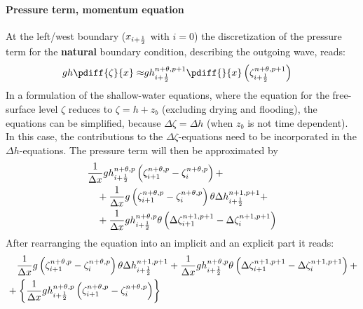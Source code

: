 \paragraph*{Pressure term, momentum equation}
At the left/west boundary ($x_{i+\frac{1}{2}}$ with $i=0$) the discretization of the pressure term for the \textbf{natural} boundary condition, describing the outgoing wave, reads:
\begin{align}
    gh \pdiff{\zeta}{x} \approx
& g h^{n+\theta,p+1}_{i+\half} \pdiff{}{x} \left( \zeta^{n+\theta,p+1}_{i+\half}\right)
\end{align}
In a formulation of the shallow-water equations, where the equation for the free-surface level $\zeta$ reduces to $\zeta = h + z_b$ (excluding drying and flooding), the equations can be simplified, because $\Delta \zeta = \Delta h$ (when $z_b$ is not time dependent).
In this case, the contributions to the $\Delta \zeta$-equations need to be incorporated in the $\Delta h$-equations.
The pressure term will then be approximated by
\begin{align}
& \frac{1}{\Delta x} g h^{n+\theta,p}_{i+\frac{1}{2}} \left( \zeta^{n+\theta,p}_{i+1} - \zeta^{n+\theta,p}_{i}  \right) +
\nonumber \\*
& \quad + \frac{1}{\Delta x}  g \left(  \zeta^{n+\theta,p}_{i+1} - \zeta^{n+\theta,p}_{i} \right) \theta \Delta h^{n+1, p+1}_{i+\frac{1}{2}} +
\nonumber \\*
& \quad +   \frac{1}{\Delta x} g h^{n+\theta, p}_{i+\frac{1}{2}}
\theta \left( \Delta \zeta^{n+1,p+1}_{i+1}  - \Delta \zeta^{n+1,p+1}_{i}\right)
\end{align}
After rearranging the equation into an implicit and an explicit part it reads:
\begin{align}
& \quad \frac{1}{\Delta x}  g \left(  \zeta^{n+\theta,p}_{i+1} - \zeta^{n+\theta,p}_{i} \right) \theta \Delta h^{n+1, p+1}_{i+\frac{1}{2}} +   \frac{1}{\Delta x} g h^{n+\theta, p}_{i+\frac{1}{2}}
\theta \left( \Delta \zeta^{n+1,p+1}_{i+1}  - \Delta \zeta^{n+1,p+1}_{i}\right) +
\nonumber \\*
& + \left\{
\frac{1}{\Delta x} g h^{n+\theta,p}_{i+\frac{1}{2}} \left( \zeta^{n+\theta,p}_{i+1} - \zeta^{n+\theta,p}_{i}  \right)  \right\}
\end{align}
